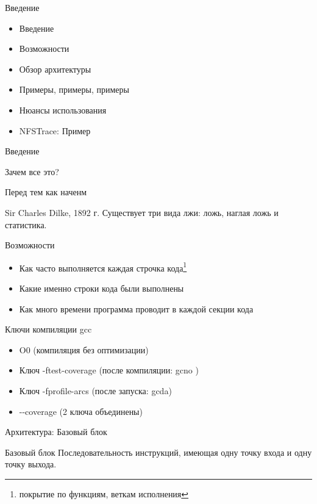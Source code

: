 \begin{frame}{Введение}
  \begin{itemize}
    \item Введение
    \item Возможности
    \item Обзор архитектуры
    \item Примеры, примеры, примеры 
    \item Нюансы использования
    \item NFSTrace: Пример
  \end{itemize}
\end{frame}

\begin{frame}{Введение}
  \begin{center}
    \Large Зачем все это?
  \end{center}
\end{frame}

\begin{frame}{Перед тем как наченм}
  \begin{block}{Sir Charles Dilke, 1892 г.}
    Существует три вида лжи: ложь, наглая ложь и статистика.
  \end{block}
\end{frame}

\begin{frame}{Возможности}
  \begin{itemize}
    \item Как часто выполняется каждая строчка кода\footnote{покрытие по функциям, веткам исполнения}
    \item Какие именно строки кода были выполнены
    \item Как много времени программа проводит в каждой секции кода
  \end{itemize}
\end{frame}

\begin{frame}{Ключи компиляции gcc}
  \begin{itemize}
    \item O0 (компиляция без оптимизации)
    \item Ключ -ftest-coverage (после компиляции: gcno )
    \item Ключ -fprofile-arcs (после запуска:  gcda)
    \item -{}-coverage (2 ключа объединены)
  \end{itemize}
\end{frame}

\begin{frame}{Архитектура: Базовый блок}
    \begin{block}{Базовый блок}
        Последовательность инструкций, имеющая одну точку входа и одну точку выхода.
    \end{block}
\end{frame}

